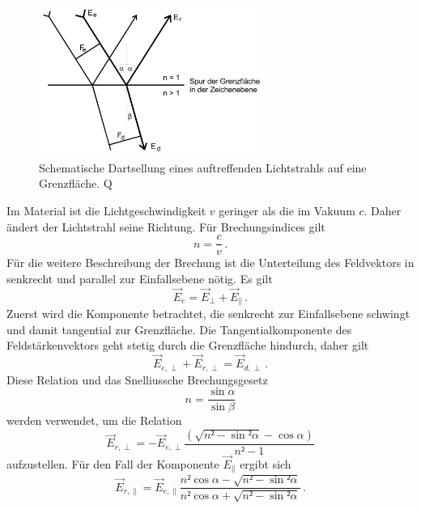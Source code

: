 \begin{figure}
    \centering
    \includegraphics[width=0.65\textwidth]{content/Bilder/allgemeines_Bild.jpeg}
    \caption{Schematische Dartsellung eines auftreffenden Lichtstrahls auf eine Grenzfläche. Q\cite{anleitungV407}}
    \label{fig:allgemein}
\end{figure}
Im Material ist die Lichtgeschwindigkeit $v$ geringer als die im Vakuum $c$. Daher ändert der Lichtstrahl seine Richtung. Für Brechungsindices 
gilt 
\begin{equation}
    n = \frac{c}{v}\, .
    \label{eqn:Brechungsindex}
\end{equation}
Für die weitere Beschreibung der Brechung ist die Unterteilung des Feldvektors in senkrecht und parallel zur Einfallsebene nötig. Es gilt 
\begin{equation}
    \vec{E}_e = \vec{E}_{\perp} + \vec{E}_{\parallel} \, .
    \label{eqn:Aufteilung}
\end{equation}
Zuerst wird die Komponente betrachtet, die senkrecht zur Einfallsebene schwingt und damit tangential zur Grenzfläche. 
Die Tangentialkomponente des Feldstärkenvektors geht stetig durch die Grenzfläche hindurch, daher gilt 
\begin{equation}
    \vec{E}_{e,\perp} + \vec{E}_{r,\perp} = \vec{E}_{d,\perp} \, .
\end{equation}
Diese Relation und das Snelliussche Brechungsgesetz 
\begin{equation}
    n = \frac{\sin{\alpha}}{\sin{\beta}}
    \label{eqn:snivellus}
\end{equation}
werden verwendet, um die Relation 
\begin{equation}
    \vec{E}_{r,\perp} = - \vec{E}_{e,\perp} \frac{\left(\sqrt{n² - \sin²{\alpha}}- \cos{\alpha}\right)}{n² - 1}
    \label{eqn:E_r_senkrecht}
\end{equation}
aufzustellen.
Für den Fall der Komponente $\vec{E}_{\parallel}$ ergibt sich 
\begin{equation}
    \vec{E}_{r,\parallel} = \vec{E}_{e,\parallel} \frac{n² \cos{\alpha} - \sqrt{n² - \sin²{\alpha}}}{n² \cos{\alpha} + \sqrt{n² - \sin²{\alpha}}} \, .
    \label{eqn:E_r_parallel}
\end{equation}
